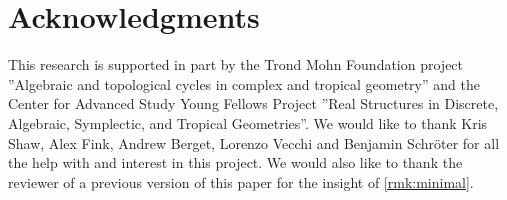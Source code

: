 \section{Acknowledgments}

This research is supported in part by the Trond Mohn Foundation project ''Algebraic and topological cycles in complex and tropical geometry'' and the Center for Advanced Study Young Fellows Project ''Real Structures in Discrete, Algebraic, Symplectic, and Tropical Geometries''.
We would like to thank Kris Shaw, Alex Fink, Andrew Berget, Lorenzo Vecchi and Benjamin Schröter for all the help with and interest in this project. We would also like to thank the reviewer of a previous version of this paper for the insight of \cref{rmk:minimal}.

